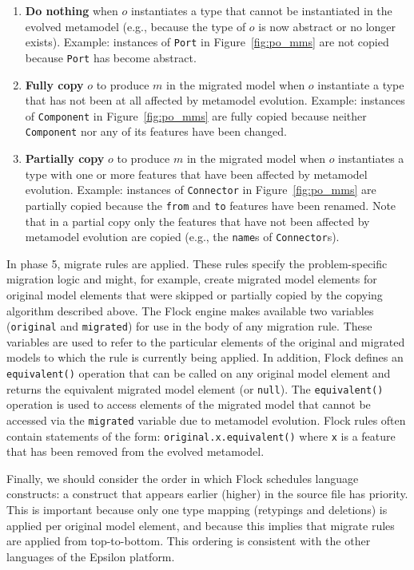\begin{enumerate}
	\item \textbf{Do nothing} when $o$ instantiates a type that cannot be instantiated in the evolved metamodel (e.g., because the type of $o$ is now abstract or no longer exists). Example: instances of \texttt{Port} in Figure~\ref{fig:po_mms} are not copied because \texttt{Port} has become abstract.
	\item \textbf{Fully copy} $o$ to produce $m$ in the migrated model when $o$ instantiate a type that has not been at all affected by metamodel evolution. Example: instances of \texttt{Component} in Figure~\ref{fig:po_mms} are fully copied because neither \texttt{Component} nor any of its features have been changed.
	\item \textbf{Partially copy} $o$ to produce $m$ in the migrated model when $o$ instantiates a type with one or more features that have been affected by metamodel evolution. Example: instances of \texttt{Connector} in Figure~\ref{fig:po_mms} are partially copied because the \texttt{from} and \texttt{to} features have been renamed. Note that in a partial copy only the features that have not been affected by metamodel evolution are copied (e.g., the \texttt{name}s of \texttt{Connector}s).
\end{enumerate}

In phase 5, migrate rules are applied. These rules specify the problem-specific migration logic and might, for example, create migrated model elements for original model elements that were skipped or partially copied by the copying algorithm described above. The Flock engine makes available two variables (\texttt{or\-ig\-in\-al} and \texttt{mi\-gr\-at\-ed}) for use in the body of any migration rule. These variables are used to refer to the particular elements of the original and migrated models to which the rule is currently being applied. In addition, Flock defines an \texttt{equivalent()} operation that can be called on any original model element and returns the equivalent migrated model element (or \texttt{null}). The \texttt{equivalent()} operation is used to access elements of the migrated model that cannot be accessed via the \texttt{migrated} variable due to metamodel evolution. Flock rules often contain statements of the form: \texttt{original.x.equivalent()} where \texttt{x} is a feature that has been removed from the evolved metamodel.

Finally, we should consider the order in which Flock schedules language constructs: a construct that appears earlier (higher) in the source file has priority. This is important because only one type mapping (retypings and deletions) is applied per original model element, and because this implies that migrate rules are applied from top-to-bottom. This ordering is consistent with the other languages of the Epsilon platform.


